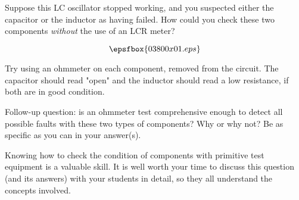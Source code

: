

Suppose this LC oscillator stopped working, and you suspected either the capacitor or the inductor as having failed.  How could you check these two components {\it without} the use of an LCR meter?

$$\epsfbox{03800x01.eps}$$







Try using an ohmmeter on each component, removed from the circuit.  The capacitor should read "open" and the inductor should read a low resistance, if both are in good condition.

\vskip 10pt

Follow-up question: is an ohmmeter test comprehensive enough to detect all possible faults with these two types of components?  Why or why not?  Be as specific as you can in your answer(s).







Knowing how to check the condition of components with primitive test equipment is a valuable skill.  It is well worth your time to discuss this question (and its answers) with your students in detail, so they all understand the concepts involved.




